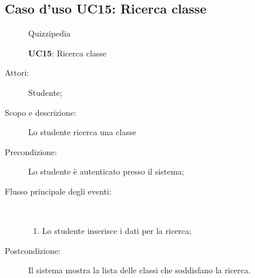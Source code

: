\subsection{Caso d'uso UC15: Ricerca classe}
	\begin{figure}[H]
		\centering
		\begin{resizedtikzpicture}{\textwidth}
		\begin{umlsystem}[x=0, fill=lightgray!20]{Quizzipedia}
		\end{umlsystem}
		\end{resizedtikzpicture}
		\caption{\textbf{UC15}: Ricerca classe}
		\label{UC15}
	\end{figure}
\begin{description}
\item[Attori:] Studente;
\item[Scopo e descrizione:] Lo studente ricerca una classe
      \item[Precondizione:] Lo studente è autenticato presso il sistema;

        \item[Flusso principale degli eventi:] \ 
 \begin{enumerate}
          \item Lo studente inserisce i dati per la ricerca;

      \end{enumerate}
    \item[Postcondizione:] Il sistema mostra la lista delle classi che soddisfano la ricerca.
  \end{description}
\hypertarget{UC16}{}
